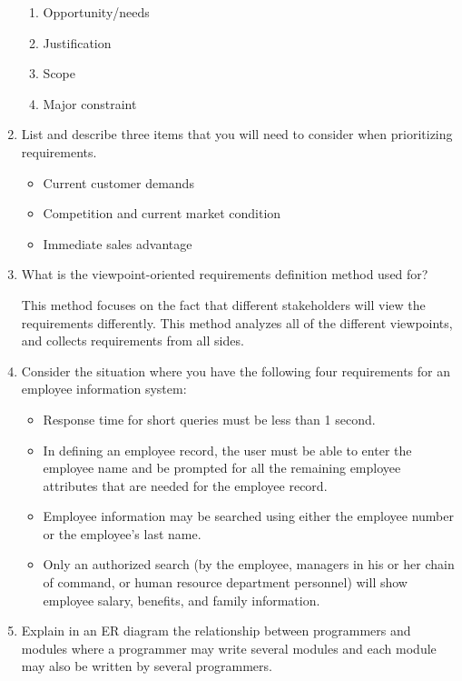 \documentclass[11pt]{article}
\begin{document}
\begin{enumerate}
    \begin{enumerate}
        \item Opportunity/needs
        \item Justification
        \item Scope
        \item Major constraint
    \end{enumerate}
    
    \item List and describe three items that you will need to consider when prioritizing requirements.
    
    \begin{itemize}
        \item Current customer demands
        \item Competition and current market condition
        \item Immediate sales advantage
    \end{itemize}
    
    \item What is the viewpoint-oriented requirements definition method used for?
    
    This method focuses on the fact that different stakeholders will view the requirements differently. This method analyzes all of the different viewpoints, and collects requirements from all sides.
    
    \item Consider the situation where you have the following four requirements for an employee information system:
    \begin{itemize}
        \item Response time for short queries must be less than 1 second. 
        \item In defining an employee record, the user must be able to enter the employee name and be prompted for all the remaining employee attributes that are needed for the employee record. 
        \item Employee information may be searched using either the employee number or the employee's last name. 
        \item Only an authorized search (by the employee, managers in his or her chain of command, or human resource department personnel) will show employee salary, benefits, and family information. 
    \end{itemize}
    
    \item Explain in an ER diagram the relationship between programmers and modules where a programmer may write several modules and each module may also be written by several programmers.
    

\end{enumerate}
\end{document}
